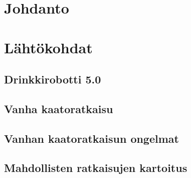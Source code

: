 \documentclass[finnish, numeric]{tauthesis}  %
\begin{document}

\tableofcontents





\glossary


\mainmatter


\chapter{Johdanto}
\label{ch:johdanto}


\chapter{Lähtökohdat}
\label{ch:lähtökohdat}

\section{Drinkkirobotti 5.0}
\label{ch:drinkkirobotti_5.0}


\section{Vanha kaatoratkaisu}
\label{ch:vanha_kaato}


\section{Vanhan kaatoratkaisun ongelmat}
\label{ch:vanhan_ongelmat}


\section{Mahdollisten ratkaisujen kartoitus}
\label{ch:muut_ratkaisut}

\end{document}
